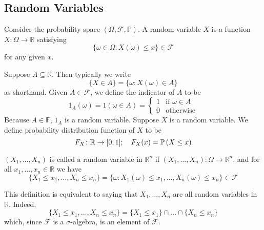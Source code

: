 \subsection{Random Variables}
\begin{definition}
	Consider the probability space \((\Omega, \mathcal F, \mathbb P)\). A random variable \(X\) is a function \(X \colon \Omega \to \mathbb R\) satisfying
	\[ \{ \omega \in \Omega \colon X(\omega) \leq x \} \in \mathcal F \]
	for any given \(x\).
\end{definition}
\noindent Suppose \(A \subseteq \mathbb R\). Then typically we write
\[ \{ X \in A \} = \{ \omega \colon X(\omega) \in A \} \]
as shorthand. Given \(A \in \mathcal F\), we define the indicator of \(A\) to be
\[ 1_A(\omega) = 1(\omega \in A) = \begin{cases}
		1 & \text{if } \omega \in A \\
		0 & \text{otherwise}
	\end{cases} \]
Because \(A \in \mathbb F\), \(1_A\) is a random variable. Suppose \(X\) is a random variable. We define probability distribution function of \(X\) to be
\[ F_X \colon \mathbb R \to [0, 1];\quad F_X(x) = \mathbb{P}\left({X \leq x}\right) \]
\begin{definition}
	\((X_1, \dots, X_n)\) is called a random variable in \(\mathbb R^n\) if \((X_1, \dots, X_n) \colon \Omega \to \mathbb R^n\), and for all \(x_1, \dots, x_n \in \mathbb R\) we have
	\[ \{ X_1 \leq x_1, \dots, X_n \leq x_n \} = \{ \omega \colon X_1(\omega) \leq x_1, \dots, X_n(\omega) \leq x_n \} \in \mathcal F \]
\end{definition}
\noindent This definition is equivalent to saying that \(X_1, \dots, X_n\) are all random variables in \(\mathbb R\). Indeed,
\[ \{ X_1 \leq x_1, \dots, X_n \leq x_n \} = \{ X_1 \leq x_1 \} \cap \dots \cap \{ X_n \leq x_n \} \]
which, since \(\mathcal F\) is a \(\sigma\)-algebra, is an element of \(\mathcal F\).
